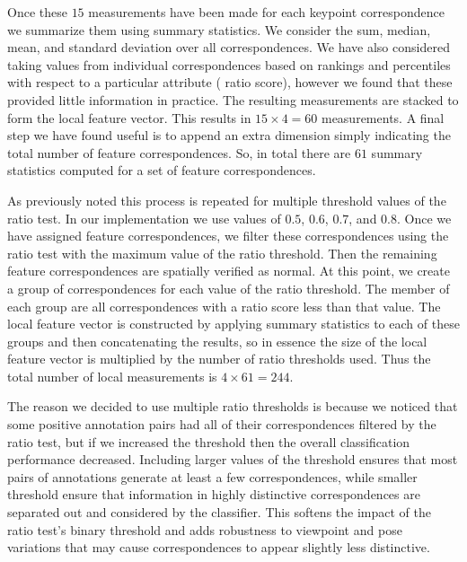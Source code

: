 Once these $15$ measurements have been made for each keypoint correspondence we summarize them using summary
  statistics.
We consider the sum, median, mean, and standard deviation over all correspondences.
We have also considered taking values from individual correspondences based on rankings and percentiles with
  respect to a particular attribute (\eg{} ratio score), however we found that these provided little information in
  practice.
The resulting measurements are stacked to form the local feature vector.
This results in $15 \times 4 = 60$ measurements.
A final step we have found useful is to append an extra dimension simply indicating the total number of feature
  correspondences.
So, in total there are $61$ summary statistics computed for a set of feature correspondences.

As previously noted this process is repeated for multiple threshold values of the ratio test.
In our implementation we use values of $0.5$, $0.6$, $0.7$, and $0.8$.
Once we have assigned feature correspondences, we filter these correspondences using the ratio test with the
  maximum value of the ratio threshold.
Then the remaining feature correspondences are spatially verified as normal.
At this point, we create a group of correspondences for each value of the ratio threshold.
The member of each group are all correspondences with a ratio score less than that value.
The local feature vector is constructed by applying summary statistics to each of these groups and then
  concatenating the results, so in essence the size of the local feature vector is multiplied by the number of
  ratio thresholds used.
Thus the total number of local measurements is $4 \times 61 = 244$.


The reason we decided to use multiple ratio thresholds is because we noticed that some positive annotation pairs
  had all of their correspondences filtered by the ratio test, but if we increased the threshold then the overall
  classification performance decreased.
Including larger values of the threshold ensures that most pairs of annotations generate at least a few
  correspondences, while smaller threshold ensure that information in highly distinctive correspondences are
  separated out and considered by the classifier.
This softens the impact of the ratio test's binary threshold and adds robustness to viewpoint and pose variations
  that may cause correspondences to appear slightly less distinctive.

